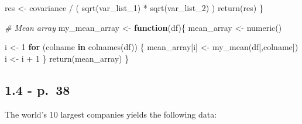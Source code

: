 \documentclass[
]{article}
\newenvironment{Shaded}{\begin{snugshade}}{\end{snugshade}}
\newcommand{\CommentTok}[1]{\textcolor[rgb]{0.56,0.35,0.01}{\textit{#1}}}
\newcommand{\ControlFlowTok}[1]{\textcolor[rgb]{0.13,0.29,0.53}{\textbf{#1}}}
\newcommand{\DecValTok}[1]{\textcolor[rgb]{0.00,0.00,0.81}{#1}}
\newcommand{\FunctionTok}[1]{\textcolor[rgb]{0.00,0.00,0.00}{#1}}
\newcommand{\NormalTok}[1]{#1}
\newcommand{\OtherTok}[1]{\textcolor[rgb]{0.56,0.35,0.01}{#1}}
\newcommand{\SpecialCharTok}[1]{\textcolor[rgb]{0.00,0.00,0.00}{#1}}
\begin{document}
\begin{Shaded}
\begin{Highlighting}[]
\NormalTok{  res }\OtherTok{\textless{}{-}}\NormalTok{ covariance }\SpecialCharTok{/}\NormalTok{ ( }\FunctionTok{sqrt}\NormalTok{(var\_list\_1) }\SpecialCharTok{*} \FunctionTok{sqrt}\NormalTok{(var\_list\_2) )}
  \FunctionTok{return}\NormalTok{(res)}
\NormalTok{\}}


\CommentTok{\# Mean array}
\NormalTok{my\_mean\_array }\OtherTok{\textless{}{-}} \ControlFlowTok{function}\NormalTok{(df)\{}
\NormalTok{  mean\_array }\OtherTok{\textless{}{-}} \FunctionTok{numeric}\NormalTok{()}
  
\NormalTok{  i }\OtherTok{\textless{}{-}} \DecValTok{1}
  \ControlFlowTok{for}\NormalTok{ (colname }\ControlFlowTok{in} \FunctionTok{colnames}\NormalTok{(df)) \{}
\NormalTok{    mean\_array[i] }\OtherTok{\textless{}{-}} \FunctionTok{my\_mean}\NormalTok{(df[,colname])}
\NormalTok{    i }\OtherTok{\textless{}{-}}\NormalTok{ i }\SpecialCharTok{+} \DecValTok{1}
\NormalTok{  \}}
  \FunctionTok{return}\NormalTok{(mean\_array)}
\NormalTok{\}}
\end{Highlighting}
\end{Shaded}

\hypertarget{p.-38}{%
\subsection{1.4 - p.~38}\label{p.-38}}

The world's 10 largest companies yields the following data:
\end{document}
